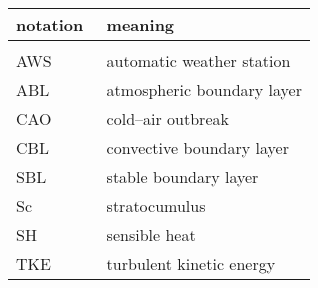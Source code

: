 \begin{onehalfspace}
	\begin{tabular}{l p{0.7\linewidth}}
\hline
		notation & meaning \\
\hline \\
		AWS	& automatic weather station \\
		ABL 	& atmospheric boundary layer \\
		CAO 	& cold--air outbreak \\
		CBL 	& convective boundary layer \\
		SBL 	& stable boundary layer \\
		Sc 	& stratocumulus\\
		SH	& sensible heat \\
		TKE	& turbulent kinetic energy \\
\hline
	\end{tabular}
\end{onehalfspace}

